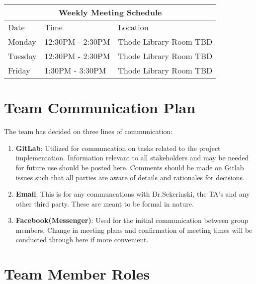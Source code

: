 \documentclass{article}
\begin{document}
\begin{tabular}{ |p{3cm}||p{3cm}|p{6cm}|  }
 \hline
 \multicolumn{3}{|c|}{Weekly Meeting Schedule} \\
 \hline
 Date &Time  & Location\\
 \hline
 Monday &   12:30PM - 2:30PM   & Thode Library Room TBD  \\
 Tuesday &   12:30PM - 2:30PM   & Thode Library Room TBD  \\
 Friday  & 1:30PM - 3:30PM & Thode Library Room TBD  \\

 \hline
\end{tabular}
\section{Team Communication Plan}

The team has decided on three lines of communication:

\begin{enumerate}
\item \textbf{GitLab}: Utilized for communcation on tasks related to the project implementation. Information relevant to all stakeholders and may be needed for future use should be posted here.  Comments should be made on Gitlab issues such that all parties are aware of details and rationales for decisions.
\item \textbf{Email}: This is for any communcations with Dr.Sekerinski, the TA's and any other third party. These are meant to be formal in nature.
\item \textbf{Facebook(Messenger)}: Used for the initial communication between group members. Change in meeting plans and confirmation of meeting times will be conducted through here if more convenient.
\end{enumerate}

\section{Team Member Roles}
\end{document}
